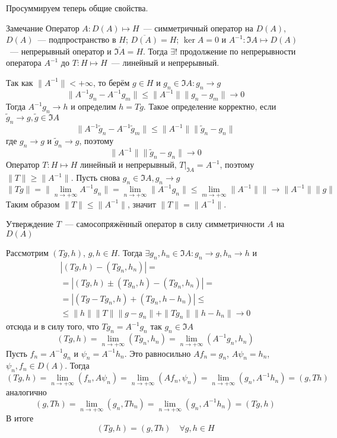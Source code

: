 \documentclass[14pt]{extarticle}
\begin{document}
Просуммируем теперь общие свойства.
\begin{MathCl}{Замечание}
    Оператор $A : D(A) \mapsto H$~--- симметричный оператор на $D(A)$, $D(A)$~--- 
    подпространство в $H$; $\overline{D(A)} = H$; $\ker A = 0$ и $A^{-1} : \Im A \mapsto D(A)
    $~--- непрерывный оператор и $\overline{\Im A} = H$.
    Тогда $\exists!$ продолжение по непрерывности оператора $A^{-1}$ до $T : H \mapsto 
    H$~--- линейный и непрерывный.
\end{MathCl}
\begin{Proof}
    Так как $\|A^{-1}\| < +\infty$, то берём $g \in H$ и $g_n \in \Im A\colon g_n \to g$
    $$
    \|A^{-1}g_n - A^{-1}g_m\| \le \|A^{-1}\|\|g_n - g_m\| \to 0
    $$
    Тогда $A^{-1}g_n \to h$  и определим $h = Tg$.
    Такое определение корректно, если $\tilde{g}_n \to g, \tilde{g} \in \Im A$
    $$
    \|A^{-1}\tilde{g}_n - A^{-1}\tilde{g}_m\| \le \|A^{-1}\|\|\tilde{g}_n - g_n\|
    $$
    где $g_n \to g$ и $\tilde{g}_n \to g$, поэтому
    $$
    \|A^{-1}\| \|\tilde{g}_n - g_n\| \to 0
    $$
    Оператор $T : H \mapsto H$ линейный и непрерывный, $T|_{\Im A} = A^{-1}$, поэтому
    $\|T\| \ge \|A^{-1}\|$.
    Пусть снова $g_n \in \Im A, g_n \to g$
    $$
    \|Tg\| = \|\lim_{n \to +\infty} A^{-1}g_n\| = \lim_{n \to +\infty}\|A^{-1}g_n\| \le
    \lim_{m \to +\infty}\|A^{-1}\|\| \to \|A^{-1}\|\|g\|
    $$
    Таким образом $\|T\| \le \|A^{-1}\|$, значит $\|T\| = \|A^{-1}\|$.
\end{Proof}
\begin{MathCl}{Утверждение}
    $T$~--- самосопряжённый оператор в силу симметричности $A$ на $D(A)$
\end{MathCl}
\begin{Proof}
    Рассмотрим $(Tg, h)$, $g,h \in H$.
    Тогда $\exists g_n, h_n \in \Im A\colon g_n \to g, h_n \to h$ и
    \begin{multline*}
    |(Tg, h) - (Tg_n, h_n)| =\\= |(Tg,h) \pm (Tg_n, h) - (Tg_n, h_n)| =\\= |(Tg - Tg_n,  h) + (Tg_n, 
    h - h_n)|
    \le\\\le \|h\|\|T\|\|g - g_n\|
    + \|T g_n\| \|h - h_n\| \to 0
    \end{multline*}
    отсюда и в силу того, что $Tg_n =A^{-1} g_n$ так $g_n \in \Im A$
    $$
    (Tg, h) = \lim_{n \to +\infty}(Tg_n, h_n) = \lim_{n \to +\infty}(A^{-1}g_n, h_n)
    $$
    Пусть $f_n = A^{-1}g_n$ и $\psi_n = A^{-1} h_n$.
    Это равносильно $Af_n = g_n$, $A\psi_n = h_n$, $\psi_n, f_n \in D(A)$.
    Тогда
    $$
    (Tg, h) = \lim_{n \to +\infty}(f_n, A\psi_n) = \lim_{n \to +\infty}(Af_n, \psi_n) = \lim_{n \to +
    \infty}(g_n, A^{-1}h_n) = (g, Th)
    $$
    аналогично
    $$
    (g, Th) = \lim_{n \to +\infty}(g_n, Th_n) = \lim_{n \to +\infty}(g_n, A^{-1}h_n) = (Tg, h)
    $$
    В итоге 
    $$
    (Tg, h) = (g, Th)\quad \forall g,h \in H
    $$
\end{Proof}
\end{document}
